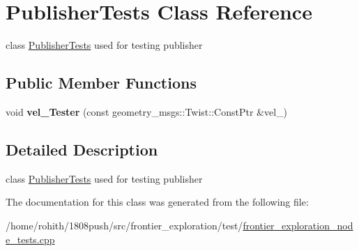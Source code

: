 \hypertarget{classPublisherTests}{}\section{Publisher\+Tests Class Reference}
\label{classPublisherTests}


class \hyperlink{classPublisherTests}{Publisher\+Tests} used for testing publisher  


\subsection*{Public Member Functions}
\begin{DoxyCompactItemize}
\item 
void {\bfseries vel\+\_\+\+Tester} (const geometry\+\_\+msgs\+::\+Twist\+::\+Const\+Ptr \&vel\+\_\+)\hypertarget{classPublisherTests_a6dd0632aa316a9a5ee5be6063dd13608}{}\label{classPublisherTests_a6dd0632aa316a9a5ee5be6063dd13608}

\end{DoxyCompactItemize}


\subsection{Detailed Description}
class \hyperlink{classPublisherTests}{Publisher\+Tests} used for testing publisher 

The documentation for this class was generated from the following file\+:\begin{DoxyCompactItemize}
\item 
/home/rohith/1808push/src/frontier\+\_\+exploration/test/\hyperlink{frontier__exploration__node__tests_8cpp}{frontier\+\_\+exploration\+\_\+node\+\_\+tests.\+cpp}\end{DoxyCompactItemize}
